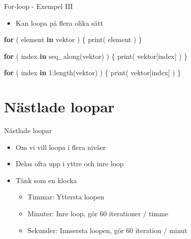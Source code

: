 \documentclass[
  11pt,
  ignorenonframetext,
]{beamer}
\newenvironment{Shaded}{\begin{snugshade}}{\end{snugshade}}
\newcommand{\ControlFlowTok}[1]{\textcolor[rgb]{0.13,0.29,0.53}{\textbf{#1}}}
\newcommand{\DecValTok}[1]{\textcolor[rgb]{0.00,0.00,0.81}{#1}}
\newcommand{\FunctionTok}[1]{\textcolor[rgb]{0.00,0.00,0.00}{#1}}
\newcommand{\NormalTok}[1]{#1}
\newcommand{\SpecialCharTok}[1]{\textcolor[rgb]{0.00,0.00,0.00}{#1}}
\providecommand{\tightlist}{%
  \setlength{\itemsep}{0pt}\setlength{\parskip}{0pt}}
\begin{document}
\begin{frame}[fragile]{For-loop - Exempel III}
\protect\hypertarget{for-loop---exempel-iii}{}
\begin{itemize}
\tightlist
\item
  Kan loopa på flera olika sätt
\end{itemize}

\begin{Shaded}
\begin{Highlighting}[]
\ControlFlowTok{for}\NormalTok{ ( element }\ControlFlowTok{in}\NormalTok{ vektor ) \{}
  \FunctionTok{print}\NormalTok{( element )}
\NormalTok{\}}
\end{Highlighting}
\end{Shaded}

\begin{Shaded}
\begin{Highlighting}[]
\ControlFlowTok{for}\NormalTok{ ( index }\ControlFlowTok{in} \FunctionTok{seq\_along}\NormalTok{(vektor) ) \{}
  \FunctionTok{print}\NormalTok{( vektor[index] )}
\NormalTok{\}}
\end{Highlighting}
\end{Shaded}

\begin{Shaded}
\begin{Highlighting}[]
\ControlFlowTok{for}\NormalTok{ ( index }\ControlFlowTok{in} \DecValTok{1}\SpecialCharTok{:}\FunctionTok{length}\NormalTok{(vektor) ) \{}
  \FunctionTok{print}\NormalTok{( vektor[index] )}
\NormalTok{\}}
\end{Highlighting}
\end{Shaded}
\end{frame}

\hypertarget{nuxe4stlade-loopar}{%
\section{Nästlade loopar}\label{nuxe4stlade-loopar}}


\begin{frame}{Nästlade loopar}
\protect\hypertarget{nuxe4stlade-loopar-1}{}
\begin{itemize}
\tightlist
\item
  Om vi vill loopa i flera nivåer
\item
  Delas ofta upp i yttre och inre loop
\item
  Tänk som en klocka

  \begin{itemize}
  \tightlist
  \item
    Timmar: Yttersta loopen
  \item
    Minuter: Inre loop, gör 60 iterationer / timme
  \item
    Sekunder: Innsersta loopen, gör 60 iteration / minut
  \end{itemize}
\end{itemize}
\end{frame}
\end{document}
